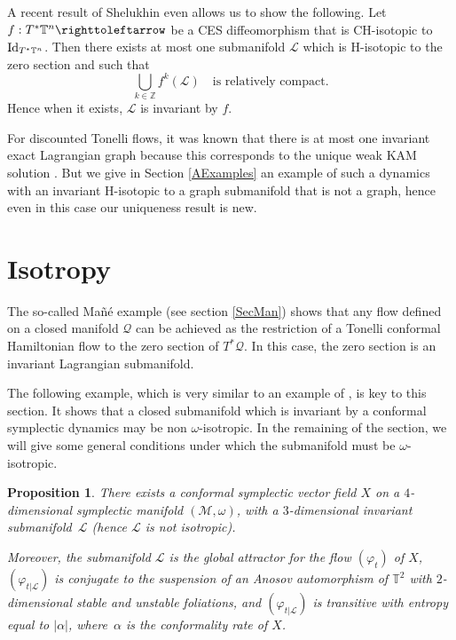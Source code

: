 \documentclass[JEP,XML,SOM,Unicode,published]{cedram}
\newtheorem{proposition}{Proposition}
\theoremstyle{definition}
\def\Z{\mathbb{Z}}
\def\T{\mathbb{T}}
\def\cL{{\mathcal L}}
\def\cM{{\mathcal M}}
\def\cQ{{\mathcal Q}}
\begin{document}
A recent result of Shelukhin even allows us to show the following. Let $f:T^*\T^n \righttoleftarrow$ be a CES diffeomorphism that is CH-isotopic to ${\rm Id}_{T^*\T^n}$. Then there exists at most one submanifold $\cL$ which is H-isotopic to the zero section and such that
\[
\bigcup_{k\in\Z}f^k(\cL)\quad\text{is relatively compact}.
\]
Hence when it exists, $\cL$ is invariant by $f$.

For discounted Tonelli flows, it was known that there is at most one invariant exact Lagrangian graph because this corresponds to the unique weak KAM solution \cite{MarSor2017}. But we give in Section \ref{AExamples} an example of such a dynamics with an invariant H-isotopic to a graph submanifold that is not a graph, hence even in this case our uniqueness result is new.

\section{Isotropy}\label{Sisotropy}

The so-called Mañé example \cite{Man1992} (see section \ref{SecMan}) shows that any flow defined on a closed manifold $\cQ$ can be achieved as the restriction of a Tonelli conformal
Hamiltonian flow to the zero section of $T^*\cQ$. In this case, the zero section is an invariant Lagrangian submanifold.

The following example, which is very similar to an example of \cite{Geiges1995}, is key to this section. It shows that a closed submanifold which is invariant by a conformal symplectic dynamics may be non $\omega$-isotropic. In the remaining of the section, we will give some general conditions under which the submanifold must be $\omega$-isotropic.

\begin{proposition}\label{Pflownonisotrop}
There exists a conformal symplectic vector field $X$ on a $4$\nobreakdash-dimen\-sional symplectic manifold $({\cM}, \omega)$, with a $3$\nobreakdash-dimensional invariant submani\-fold~${\cL}$ (hence ${\cL}$ is not isotropic).

Moreover, the submanifold ${\cL}$ is the global attractor for the flow $(\varphi_t)$ of $X$, $(\varphi_{t|\cL})$ is conjugate to the suspension of an Anosov automorphism of $\T^2$ with $2$\nobreakdash-dimensional stable and unstable foliations, and $(\varphi_{t|\cL})$ is transitive with entropy equal to $|\alpha|$, where~$\alpha$ is the conformality rate of $X$.
\end{proposition}
\end{document}
